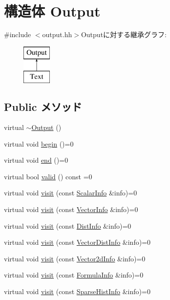 \hypertarget{structStats_1_1Output}{
\section{構造体 Output}
\label{structStats_1_1Output}
}


{\ttfamily \#include $<$output.hh$>$}Outputに対する継承グラフ:\begin{figure}[H]
\begin{center}
\leavevmode
\includegraphics[height=2cm]{structStats_1_1Output}
\end{center}
\end{figure}
\subsection*{Public メソッド}
\begin{DoxyCompactItemize}
\item 
virtual \hyperlink{structStats_1_1Output_a8c3620b32551505c8ee5ff51b59e57aa}{$\sim$Output} ()
\item 
virtual void \hyperlink{structStats_1_1Output_aaf893c33f3c041e289a12c153dcc9789}{begin} ()=0
\item 
virtual void \hyperlink{structStats_1_1Output_aa540e86022c1f72380d1014d98f38f43}{end} ()=0
\item 
virtual bool \hyperlink{structStats_1_1Output_ad9248394f673632ebda5b9c455e464f2}{valid} () const =0
\item 
virtual void \hyperlink{structStats_1_1Output_a49159171d27306e1e047691f43efab71}{visit} (const \hyperlink{classStats_1_1ScalarInfo}{ScalarInfo} \&info)=0
\item 
virtual void \hyperlink{structStats_1_1Output_a6157ee2f68b0738ae8a789d20584be4d}{visit} (const \hyperlink{classStats_1_1VectorInfo}{VectorInfo} \&info)=0
\item 
virtual void \hyperlink{structStats_1_1Output_add4fd62195e918f438ee10305ea0e20e}{visit} (const \hyperlink{classStats_1_1DistInfo}{DistInfo} \&info)=0
\item 
virtual void \hyperlink{structStats_1_1Output_a0f589846ed888d3e44db1185b6510bbb}{visit} (const \hyperlink{classStats_1_1VectorDistInfo}{VectorDistInfo} \&info)=0
\item 
virtual void \hyperlink{structStats_1_1Output_ae8993423f40b8eca4bd2b1edf4670489}{visit} (const \hyperlink{classStats_1_1Vector2dInfo}{Vector2dInfo} \&info)=0
\item 
virtual void \hyperlink{structStats_1_1Output_aee6a314df4bef5e9f26fdefb884620f5}{visit} (const \hyperlink{classStats_1_1FormulaInfo}{FormulaInfo} \&info)=0
\item 
virtual void \hyperlink{structStats_1_1Output_acab7797e495fae2af2e7a37cc9b5b0ce}{visit} (const \hyperlink{classStats_1_1SparseHistInfo}{SparseHistInfo} \&info)=0
\end{DoxyCompactItemize}


